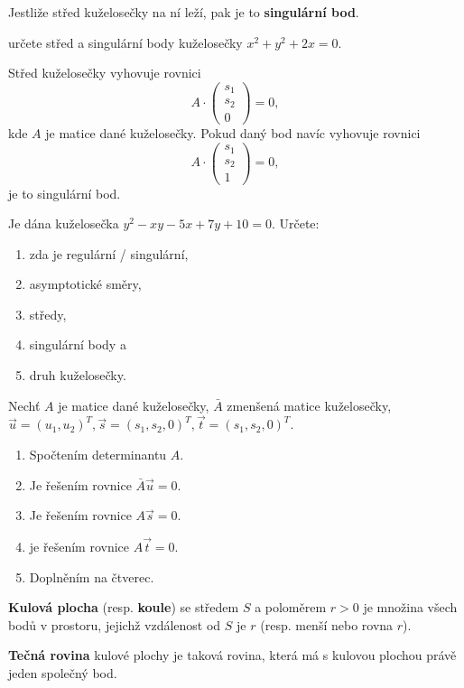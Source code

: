 \begin{definition}
    Jestliže střed kuželosečky na ní leží, pak je to \textbf{singulární bod}.
\end{definition}

\begin{priklad}
určete střed a singulární body kuželosečky $x^2+y^2+2x=0.$
\end{priklad}

\begin{reseni}
Střed kuželosečky vyhovuje rovnici
$$A\cdot \begin{pmatrix}
    s_1 \\
    s_2\\
    0
\end{pmatrix}=0,
$$
kde $A$ je matice dané kuželosečky. Pokud daný bod navíc vyhovuje rovnici
$$A\cdot \begin{pmatrix}
    s_1 \\
    s_2\\
    1
\end{pmatrix}=0,
$$
je to singulární bod.
\end{reseni}

\begin{priklad}
Je dána kuželosečka $y^2-xy-5x+7y+10=0.$ Určete:
\begin{enumerate}[$a.$]
\item zda je regulární / singulární,
\item asymptotické směry,
\item středy,
\item singulární body a
\item druh kuželosečky.
\end{enumerate}
\end{priklad}

\begin{reseni}
Nechť $A$ je matice dané kuželosečky, $\bar{A}$ zmenšená matice kuželosečky, $\vec u=(u_1,u_2)^T, \vec s=(s_1,s_2,0)^T,\vec t=(s_1,s_2,0)^T$.
\begin{enumerate}[$a.$]
\item Spočtením determinantu $A$.
\item Je řešením rovnice $\bar A\vec u=0.$
\item Je řešením rovnice $A\vec s=0.$
\item je řešením rovnice $A\vec t = 0.$
\item Doplněním na čtverec.
\end{enumerate}
\end{reseni}

\begin{definition}
\textbf{Kulová plocha} (resp. \textbf{koule}) se středem $S$ a poloměrem $r>0$ je množina všech bodů v prostoru,
jejichž vzdálenost od $S$ je $r$ (resp. menší nebo rovna $r$).
\end{definition}

\begin{definition}
\textbf{Tečná rovina} kulové plochy je taková rovina, která má s kulovou plochou právě
jeden společný bod.
\end{definition}
